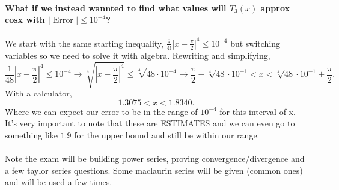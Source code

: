 \paragraph{What if  we instead wannted to find what values will $ T_3\left( x \right)  $ approx cosx with $ \left| \text{ Error } \right|\le 10^{ -4 } $?}
We start with the same starting inequality, $ \frac{ \frac{ 1 }{ 2 }  }{ 4! } \left| x-\frac{ \pi }{ 2 }  \right|^{ 4 }\le 10^{ -4 } $ but switching variables so we need to solve it with algebra. Rewriting and simplifying,
\[
\frac{ 1 }{ 48 } \left| x-\frac{ \pi }{ 2 }  \right|^{ 4 } \le 10^{ -4 } \to \sqrt[ 4 ]{ \left| x-\frac{ \pi }{ 2 }  \right|^{ 4 } } \le \sqrt[ 4 ]{ 48\cdot 10^{ -4 } } \to \frac{ \pi }{ 2 } - \sqrt[ 4 ]{ 48 } \cdot 10^{ -1 }< x < \sqrt[ 4 ]{ 48 } \cdot 10^{ -1 }+\frac{ \pi }{ 2 } 
.\] 
With a calculator,
\[
1.3075 < x < 1.8340
.\] 
Where we can expect our error to be in the range of $ 10^{ -4 } $ for this interval of x. It's very important to note that these are ESTIMATES and we can even go to something like $ 1.9 $ for the upper bound and still be within our range. \\ \\
Note the exam will be building power series, proving convergence/divergence and a few taylor series questions. Some maclaurin series will be given (common ones) and will be used a few times. 
